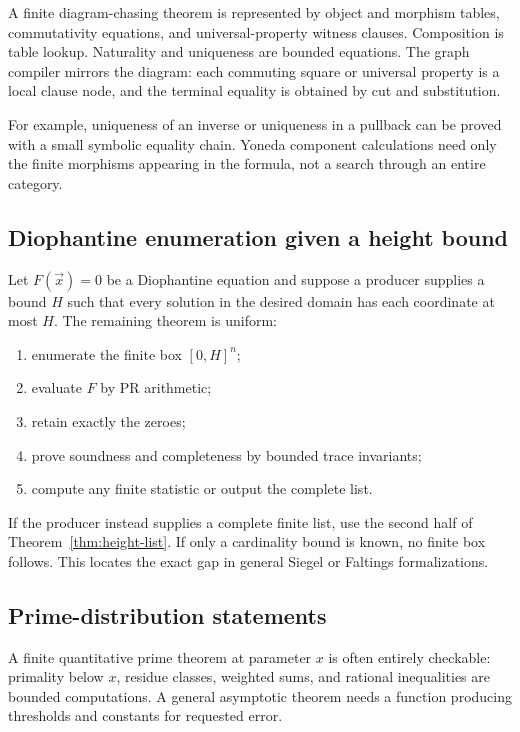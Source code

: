 A finite diagram-chasing theorem is represented by object and morphism tables,
commutativity equations, and universal-property witness clauses.  Composition
is table lookup.  Naturality and uniqueness are bounded equations.  The graph
compiler mirrors the diagram: each commuting square or universal property is a
local clause node, and the terminal equality is obtained by cut and
substitution.

For example, uniqueness of an inverse or uniqueness in a pullback can be
proved with a small symbolic equality chain.  Yoneda component calculations
need only the finite morphisms appearing in the formula, not a search through
an entire category.

\subsection{Diophantine enumeration given a height bound}

Let \(F(\vec x)=0\) be a Diophantine equation and suppose a producer supplies a
bound \(H\) such that every solution in the desired domain has each coordinate
at most \(H\).  The remaining theorem is uniform:

\begin{enumerate}
\item enumerate the finite box \([0,H]^n\);
\item evaluate \(F\) by PR arithmetic;
\item retain exactly the zeroes;
\item prove soundness and completeness by bounded trace invariants;
\item compute any finite statistic or output the complete list.
\end{enumerate}

If the producer instead supplies a complete finite list, use the second half of
Theorem~\ref{thm:height-list}.  If only a cardinality bound is known, no finite
box follows.  This locates the exact gap in general Siegel or Faltings
formalizations.

\subsection{Prime-distribution statements}

A finite quantitative prime theorem at parameter \(x\) is often entirely
checkable: primality below \(x\), residue classes, weighted sums, and rational
inequalities are bounded computations.  A general asymptotic theorem needs a
function producing thresholds and constants for requested error.

